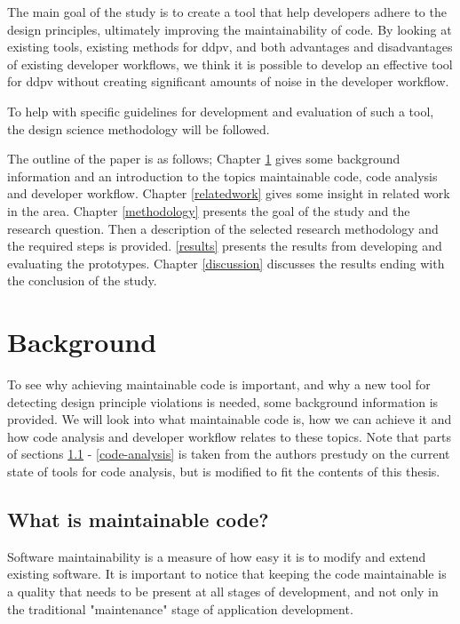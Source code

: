 \documentclass[pdftex,10pt,b5paper,twoside]{report}
\begin{document}
The main goal of the study is to create a tool that help developers adhere to the design principles, ultimately improving the maintainability of code. By looking at existing tools, existing methods for \acrfull{ddpv}, and both advantages and disadvantages of existing developer workflows, we think it is possible to develop an effective tool for \gls{ddpv} without creating significant amounts of noise in the developer workflow.

To help with specific guidelines for development and evaluation of such a tool, the design science methodology will be followed.


The outline of the paper is as follows; Chapter \ref{background} gives some background information and an introduction to the topics maintainable code, code analysis and developer workflow. Chapter \ref{relatedwork} gives some insight in related work in the area. Chapter \ref{methodology} presents the goal of the study and the research question. Then a description of the selected research methodology and the required steps is provided. \ref{results} presents the results from developing and evaluating the prototypes. Chapter \ref{discussion} discusses the results ending with the conclusion of the study.  

\cleardoublepage
\chapter{Background}

\label{background}
To see why achieving maintainable code is important, and why a new tool for detecting design principle violations is needed, some background information is provided. We will look into what maintainable code is, how we can achieve it and how code analysis and developer workflow relates to these topics. Note that parts of sections \ref{maintainable-code} - \ref{code-analysis} is taken from the authors prestudy on the current state of tools for code analysis\cite{prestudy}, but is modified to fit the contents of this thesis.

\section{What is maintainable code?}
\label{maintainable-code}
Software maintainability is a measure of how easy it is to modify and extend existing software. It is important to notice that keeping the code maintainable is a quality that needs to be present at all stages of development, and not only in the traditional "maintenance" stage of application development.  
\end{document}
